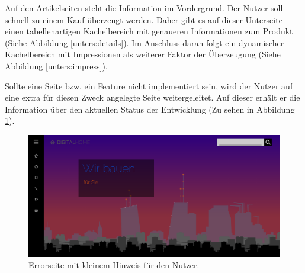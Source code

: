 Auf den Artikelseiten steht die Information im Vordergrund. Der Nutzer soll schnell zu einem Kauf überzeugt werden. Daher gibt es auf dieser Unterseite einen tabellenartigen Kachelbereich mit genaueren Informationen zum Produkt (Siehe Abbildung \ref{unters:details}). Im Anschluss daran folgt ein dynamischer Kachelbereich mit Impressionen als weiterer Faktor der Überzeugung (Siehe Abbildung \ref{unters:impress}).

Sollte eine Seite bzw. ein Feature nicht implementiert sein, wird der Nutzer auf eine extra für diesen Zweck angelegte Seite weitergeleitet. Auf dieser erhält er die Information über den aktuellen Status der Entwicklung (Zu sehen in Abbildung \ref{unters:err}).

\begin{figure} [h]
	\includegraphics[width=\textwidth]{./img/unters_err.png}
	\caption{Errorseite mit kleinem Hinweis für den Nutzer.}
	\label{unters:err}
\end{figure}